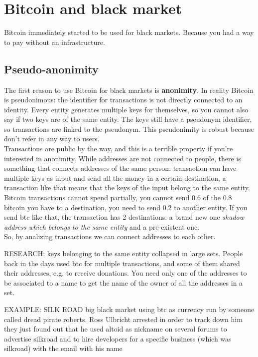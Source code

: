 \iffalse
\section{Bitcoin and black market}
    Bitcoin immediately started to be used for black markets. Because you had a way to pay without an infrastructure.
    \subsection{Pseudo-anonimity}
        The first reason to use Bitcoin for black markets is \textbf{anonimity}. In reality Bitcoin is pseudonimous: the identifier for transactions is not directly connected to an identity. Every entity generates multiple keys for themselves, so you cannot also say if two keys are of the same entity. The keys still have a pseudonym identifier, so transactions are linked to the pseudonym. This pseudonimity is robust because don't refer in any way to users.\\
        Transactions are public by the way, and this is a terrible property if you're interested in anonimity. While addresses are not connected to people, there is something that connects addresses of the same person: transaction can have multiple keys as input and send all the money in a certain destination, a transaction like that means that the keys of the input belong to the same entity.\\
        Bitcoin transactions cannot spend partially, you cannot send 0.6 of the 0.8 bitcoin you have to a destination, you need to send 0.2 to another entity. If you send btc like that, the transaction has 2 destinations: a brand new one \textit{shadow address which belongs to the same entity} and a pre-existent one.\\
        So, by analizing transactions we can connect addresses to each other.

        RESEARCH:
            keys belonging to the same entity collapsed in large sets.
            People back in the days used btc for multiple transactions, and some of them shared their addresses, e.g. to receive donations.
            You need only one of the addresses to be associated to a name to get the name of the owner of all the addresses in a set.

        EXAMPLE: SILK ROAD
            big black market using btc as currency run by someone called dread pirate roberts.
            Ross Ulbricht arrested 
            in order to track down him they just found out that he used altoid as nickname on several forums to advertise silkroad and to hire developers for a specific business (which was silkroad)
            with the email with his name 

